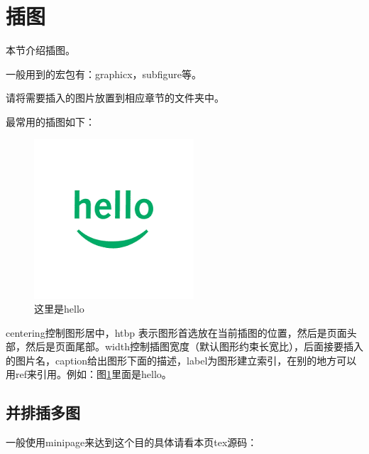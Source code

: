 \section{插图}
本节介绍插图。

一般用到的宏包有：graphicx，subfigure等。

请将需要插入的图片放置到相应章节的文件夹中。

最常用的插图如下：

\begin{figure}[htbp]
 \centering
        \includegraphics[width=0.5\columnwidth]{hello.png}
        \caption{
                \label{hello}
                这里是hello
        }
\end{figure}

centering控制图形居中，htbp 表示图形首选放在当前插图的位置，然后是页面头部，然后是页面尾部。width控制插图宽度（默认图形约束长宽比），后面接要插入的图片名，caption给出图形下面的描述，label为图形建立索引，在别的地方可以用ref来引用。例如：图\ref{hello}里面是hello。

\subsection{并排插多图}

一般使用minipage来达到这个目的具体请看本页tex源码：

